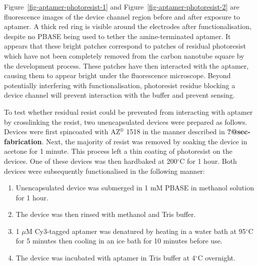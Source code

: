 \documentclass[
  a4paper,
]{scrbook}
\begin{document}
Figure~\ref{fig-aptamer-photoresist-1} and
Figure~\ref{fig-aptamer-photoresist-2} are fluorescence images of the
device channel region before and after exposure to aptamer. A thick red
ring is visible around the electrodes after functionalisation, despite
no PBASE being used to tether the amine-terminated aptamer. It appears
that these bright patches correspond to patches of residual photoresist
which have not been completely removed from the carbon nanotube square
by the development process. These patches have then interacted with the
aptamer, causing them to appear bright under the fluorescence
microscope. Beyond potentially interfering with functionalisation,
photoresist residue blocking a device channel will prevent interaction
with the buffer and prevent sensing.

To test whether residual resist could be prevented from interacting with
aptamer by crosslinking the resist, two unencapsulated devices were
prepared as follows. Devices were first spincoated with AZ\(^\circledR\)
1518 in the manner described in \textbf{?@sec-fabrication}. Next, the
majority of resist was removed by soaking the device in acetone for 1
minute. This process left a thin coating of photoresist on the devices.
One of these devices was then hardbaked at 200\(^\circ\)C for 1 hour.
Both devices were subsequently functionalised in the following manner:

\begin{enumerate}
\def\labelenumi{\arabic{enumi}.}
\item
  Unencapsulated device was submerged in 1 mM PBASE in methanol solution
  for 1 hour.
\item
  The device was then rinsed with methanol and Tris buffer.
\item
  1 \(\mu\)M Cy3-tagged aptamer was denatured by heating in a water bath
  at 95\(^\circ\)C for 5 minutes then cooling in an ice bath for 10
  minutes before use.
\item
  The device was incubated with aptamer in Tris buffer at 4\(^\circ\)C
  overnight.
\end{enumerate}
\end{document}
